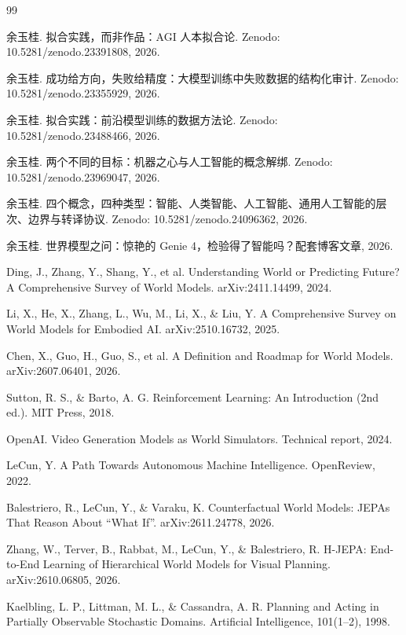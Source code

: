 \documentclass[10pt,fontset=fandol]{ctexart}
\begin{document}
\begin{thebibliography}{99}\small

余玉桂. 拟合实践，而非作品：AGI 人本拟合论. Zenodo: 10.5281/zenodo.23391808, 2026.

余玉桂. 成功给方向，失败给精度：大模型训练中失败数据的结构化审计. Zenodo: 10.5281/zenodo.23355929, 2026.

余玉桂. 拟合实践：前沿模型训练的数据方法论. Zenodo: 10.5281/zenodo.23488466, 2026.

余玉桂. 两个不同的目标：机器之心与人工智能的概念解绑. Zenodo: 10.5281/zenodo.23969047, 2026.

余玉桂. 四个概念，四种类型：智能、人类智能、人工智能、通用人工智能的层次、边界与转译协议. Zenodo: 10.5281/zenodo.24096362, 2026.

余玉桂. 世界模型之问：惊艳的 Genie 4，检验得了智能吗？配套博客文章, 2026.

Ding, J., Zhang, Y., Shang, Y., et al. Understanding World or Predicting Future? A Comprehensive Survey of World Models. arXiv:2411.14499, 2024.

Li, X., He, X., Zhang, L., Wu, M., Li, X., \& Liu, Y. A Comprehensive Survey on World Models for Embodied AI. arXiv:2510.16732, 2025.

Chen, X., Guo, H., Guo, S., et al. A Definition and Roadmap for World Models. arXiv:2607.06401, 2026.

Sutton, R. S., \& Barto, A. G. Reinforcement Learning: An Introduction (2nd ed.). MIT Press, 2018.

OpenAI. Video Generation Models as World Simulators. Technical report, 2024.

LeCun, Y. A Path Towards Autonomous Machine Intelligence. OpenReview, 2022.

Balestriero, R., LeCun, Y., \& Varaku, K. Counterfactual World Models: JEPAs That Reason About ``What If''. arXiv:2611.24778, 2026.

Zhang, W., Terver, B., Rabbat, M., LeCun, Y., \& Balestriero, R. H-JEPA: End-to-End Learning of Hierarchical World Models for Visual Planning. arXiv:2610.06805, 2026.

Kaelbling, L. P., Littman, M. L., \& Cassandra, A. R. Planning and Acting in Partially Observable Stochastic Domains. Artificial Intelligence, 101(1--2), 1998.


\end{thebibliography}
\end{document}
